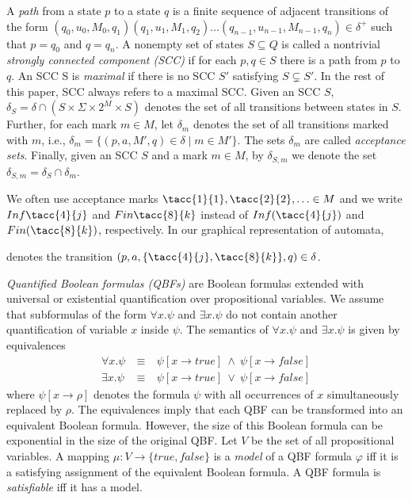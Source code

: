 \documentclass[a4paper,UKenglish,cleveref, autoref, thm-restate]{lipics-v2021}
\def\Inf{\ensuremath{\mathsf{Inf}}}
\def\Fin{\ensuremath{\mathsf{Fin}}}
\def\false{\mathit{false}}
\def\true{\mathit{true}}
\begin{document}
A \emph{path} from a state $p$ to a state $q$ is a finite sequence of
adjacent transitions of the form
$(q_0,u_0,M_0,q_1)(q_1,u_1,M_1,q_2)\dots(q_{n-1},u_{n-1},M_{n-1},q_n)\in\delta^+$
such that $p=q_0$ and $q=q_n$. A nonempty set of states $S\subseteq Q$
is called a nontrivial \emph{strongly connected component (SCC)} if
for each $p,q\in S$ there is a path from $p$ to $q$. An SCC S is
\emph{maximal} if there is no SCC $S'$ satisfying $S\subsetneq S'$. In
the rest of this paper, SCC always refers to a maximal SCC. Given an
SCC $S$, $\delta_S=\delta\cap (S\times \Sigma \times 2^M \times S)$
denotes the set of all transitions between states in $S$. Further, for
each mark $m\in M$, let $\delta_m$ denotes the set of all transitions
marked with $m$, i.e., $\delta_m=\{(p,a,M',q)\in\delta\mid m\in
M'\}$. The sets $\delta_m$ are called \emph{acceptance sets}.
Finally, given an SCC $S$ and a mark $m\in M$, by $\delta_{S,m}$ we
denote the set $\delta_{S,m}=\delta_S\cap\delta_m$.

We often use acceptance marks $\tacc{1}{1},\tacc{2}{2},\ldots\in M$
and we write $\Inf\tacc{4}{j}$ and $\Fin\tacc{8}{k}$ instead of
$\Inf(\tacc{4}{j})$ and $\Fin(\tacc{8}{k})$, respectively. In our
graphical representation of automata,
denotes the transition $(p,a,\{\tacc{4}{j},\tacc{8}{k}\},q)\in\delta$.


\bigskip

\emph{Quantified Boolean formulas (QBFs)} are Boolean formulas
extended with universal or existential quantification over
propositional variables. We assume that subformulas of the form
$\forall x.\psi$ and $\exists x.\psi$ do not contain another
quantification of variable $x$ inside $\psi$. The semantics of
$\forall x.\psi$ and $\exists x.\psi$ is given by equivalences
\[
  \begin{array}{rcl}
    \forall x.\psi &~\equiv~& \psi[x\rightarrow\true]~\wedge~\psi[x\rightarrow\false]\\
    \exists x.\psi &~\equiv~& \psi[x\rightarrow\true]~\vee~   \psi[x\rightarrow\false]
  \end{array}
\]
where $\psi[x\rightarrow \rho]$ denotes the formula $\psi$ with all
occurrences of $x$ simultaneously replaced by $\rho$. The equivalences
imply that each QBF can be transformed into an equivalent Boolean
formula. However, the size of this Boolean formula can be exponential
in the size of the original QBF. Let $V$ be the set of all
propositional variables. A mapping $\mu:V\rightarrow\{\true,\false\}$
is a \emph{model} of a QBF formula $\varphi$ iff it is a satisfying
assignment of the equivalent Boolean formula. A QBF formula is
\emph{satisfiable} iff it has a model.
\end{document}
